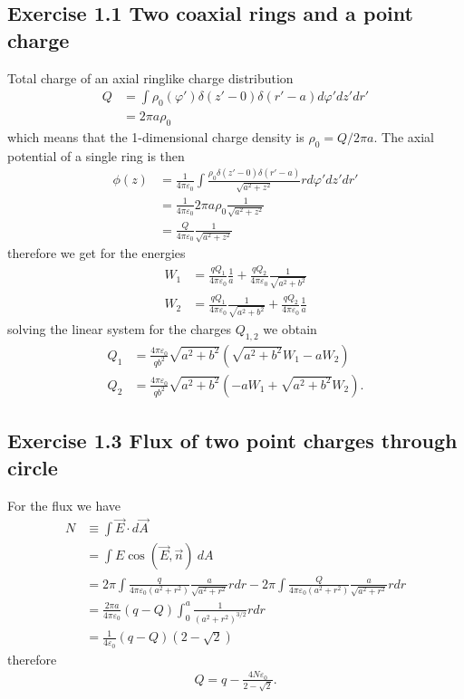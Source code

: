\documentclass[../main.tex]{subfiles}
\begin{document}
\subsection{Exercise 1.1 Two coaxial rings and a point charge}
Total charge of an axial ringlike charge distribution
\begin{align}
    Q&=\int \rho_0(\varphi')\delta(z'-0)\delta(r'-a) d\varphi' dz' dr'\\
    &=2\pi a\rho_0
\end{align}
which means that the 1-dimensional charge density is $\rho_0=Q/2\pi a$.
The axial potential of a single ring is then
\begin{align}
    \phi(z)&=\frac{1}{4\pi\varepsilon_0}\int\frac{\rho_0\delta(z'-0)\delta(r'-a)}{\sqrt{a^2+z^2}}r d\varphi' dz' dr'\\
    &=\frac{1}{4\pi\varepsilon_0}2\pi a \rho_0\frac{1}{\sqrt{a^2+z^2}}\\
    &=\frac{Q}{4\pi\varepsilon_0}\frac{1}{\sqrt{a^2+z^2}}
\end{align}
therefore we get for the energies
\begin{align}
    W_1&=\frac{qQ_1}{4\pi\varepsilon_0}\frac{1}{a}+\frac{qQ_2}{4\pi\varepsilon_0}\frac{1}{\sqrt{a^2+b^2}}\\
    W_2&=\frac{qQ_1}{4\pi\varepsilon_0}\frac{1}{\sqrt{a^2+b^2}}+\frac{qQ_2}{4\pi\varepsilon_0}\frac{1}{a}
\end{align}
solving the linear system for the charges $Q_{1,2}$ we obtain
\begin{align}
    Q_1&=\frac{4\pi\varepsilon_0}{qb^2}\sqrt{a^2+b^2}\left(\sqrt{a^2+b^2}W_1-aW_2\right)\\
    Q_2&=\frac{4\pi\varepsilon_0}{qb^2}\sqrt{a^2+b^2}\left(-aW_1+\sqrt{a^2+b^2}W_2\right).
\end{align}

\subsection{Exercise 1.3 Flux of two point charges through circle}
For the flux we have
\begin{align}
    N&\equiv\int\vec{E}\cdot d\vec{A}\\
    &=\int E \cos(\vec{E},\vec{n})\ dA\\
    &=2\pi\int\frac{q}{4\pi\varepsilon_0(a^2+r^2)}\frac{a}{\sqrt{a^2+r^2}}rdr-2\pi\int\frac{Q}{4\pi\varepsilon_0(a^2+r^2)}\frac{a}{\sqrt{a^2+r^2}}rdr\\
    &=\frac{2\pi a}{4\pi\varepsilon_0}(q-Q)\int_0^a\frac{1}{(a^2+r^2)^{3/2}}rdr\\
    &=\frac{1}{4\varepsilon_0}(q-Q)\left(2-\sqrt{2}\right)
\end{align}
therefore
\begin{align}
    Q=q-\frac{4N\varepsilon_0}{2-\sqrt{2}}.
\end{align}
\end{document}
